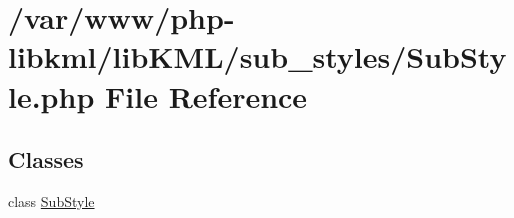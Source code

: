 \hypertarget{SubStyle_8php}{
\section{/var/www/php-\/libkml/libKML/sub\_\-styles/SubStyle.php File Reference}
\label{d0/d74/SubStyle_8php}
}
\subsection*{Classes}
\begin{DoxyCompactItemize}
\item 
class \hyperlink{classSubStyle}{SubStyle}
\end{DoxyCompactItemize}
